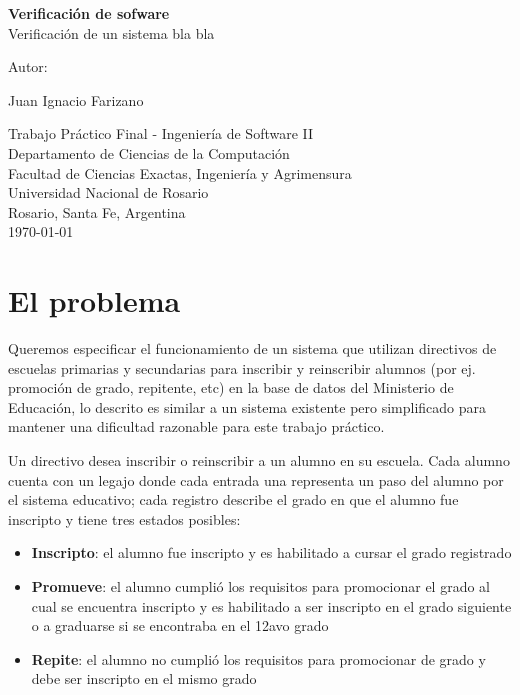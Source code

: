 \documentclass{article}
\begin{document}
\begin{titlepage}
  \thispagestyle{empty}
  \begin{center}
    
    {\huge \textbf{Verificación de sofware} \\[0.4cm]}
    {\large Verificación de un sistema bla bla} \\
    \noindent
    
    \vfill
    \vfill
    \vfill
    {\Large Autor: \par}
    {\Large Juan Ignacio Farizano\par}
  
    \vfill
    Trabajo Práctico Final - Ingeniería de Software II \\
    Departamento de Ciencias de la Computaci\'on\\
    Facultad de Ciencias Exactas, Ingenier\'ia y Agrimensura\\
    Universidad Nacional de Rosario \\
    Rosario, Santa Fe, Argentina\\[0.4cm]
    {\large \today} 
  \end{center}
  \end{titlepage}

\section*{El problema}
Queremos especificar el funcionamiento de un sistema que utilizan directivos de escuelas primarias y secundarias para inscribir y reinscribir alumnos (por ej. promoción de grado, repitente, etc) en la base de datos del Ministerio de Educación, lo descrito es similar a un sistema existente pero simplificado para mantener una dificultad razonable para este trabajo práctico.


Un directivo desea inscribir o reinscribir a un alumno en su escuela. Cada alumno cuenta con un legajo donde cada entrada una representa un paso del alumno por el sistema educativo; cada registro describe el grado en que el alumno fue inscripto y tiene tres estados posibles:

\begin{itemize}
  \item \textbf{Inscripto}: el alumno fue inscripto y es habilitado a cursar el grado registrado
  \item \textbf{Promueve}: el alumno cumplió los requisitos para promocionar el grado al cual se encuentra inscripto y es habilitado a ser inscripto en el grado siguiente o a graduarse si se encontraba en el 12avo grado
  \item \textbf{Repite}: el alumno no cumplió los requisitos para promocionar de grado y debe ser inscripto en el mismo grado
\end{itemize}
\end{document}
